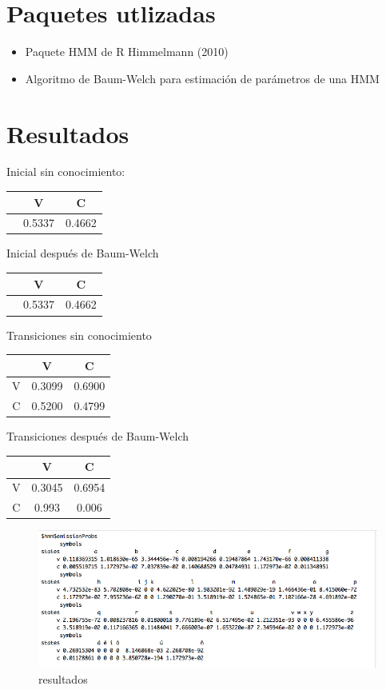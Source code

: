 \documentclass[]{article}
\begin{document}
\section{Paquetes utlizadas}\label{paquetes-utlizadas}

\begin{itemize}
\item
  Paquete HMM de R Himmelmann (2010)
\item
  Algoritmo de Baum-Welch para estimación de parámetros de una HMM
\end{itemize}

\section{Resultados}\label{resultados}

Inicial sin conocimiento:

\begin{longtable}[c]{@{}ccc@{}}
\toprule
& V & C\tabularnewline
\midrule
\endhead
& 0.5337 & 0.4662\tabularnewline
\bottomrule
\end{longtable}

Inicial después de Baum-Welch

\begin{longtable}[c]{@{}ccc@{}}
\toprule
& V & C\tabularnewline
\midrule
\endhead
& 0.5337 & 0.4662\tabularnewline
\bottomrule
\end{longtable}

Transiciones sin conocimiento

\begin{longtable}[c]{@{}ccc@{}}
\toprule
& V & C\tabularnewline
\midrule
\endhead
V & 0.3099 & 0.6900\tabularnewline
C & 0.5200 & 0.4799\tabularnewline
\bottomrule
\end{longtable}

Transiciones después de Baum-Welch

\begin{longtable}[c]{@{}ccc@{}}
\toprule
& V & C\tabularnewline
\midrule
\endhead
V & 0.3045 & 0.6954\tabularnewline
C & 0.993 & 0.006\tabularnewline
\bottomrule
\end{longtable}

\begin{figure}[htbp]
\centering
\includegraphics{salida_vocales.png}
\caption{resultados}
\end{figure}
\end{document}
